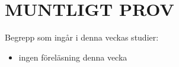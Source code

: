 \chapter{MUNTLIGT PROV}\label{chapter:W14}
Begrepp som ingår i denna veckas studier:
\begin{itemize}[noitemsep,label={$\square$},leftmargin=*]
\item ingen föreläsning denna vecka\end{itemize}
